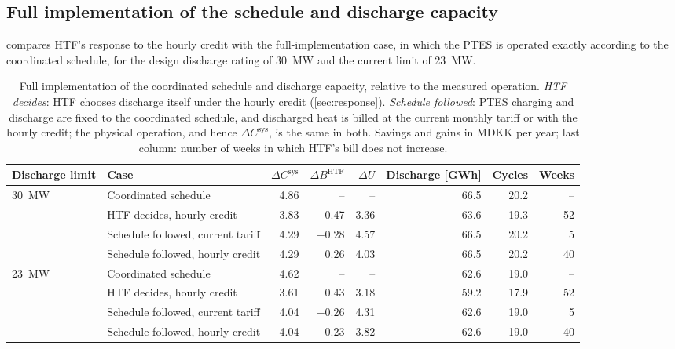 \subsection{Full implementation of the schedule and discharge capacity}
\label{sec:results-implementation}

 compares HTF's response to the hourly credit with the full-implementation case, in which the PTES is operated exactly according to the coordinated schedule, for the design discharge rating of 30~MW and the current limit of 23~MW.

\begin{table}[!htb]
    \centering
    \small
    \caption{Full implementation of the coordinated schedule and discharge capacity, relative to the measured operation. \emph{HTF decides}: HTF chooses discharge itself under the hourly credit (\cref{sec:response}). \emph{Schedule followed}: PTES charging and discharge are fixed to the coordinated schedule, and discharged heat is billed at the current monthly tariff or with the hourly credit; the physical operation, and hence $\Delta C^{\mathrm{sys}}$, is the same in both. Savings and gains in MDKK per year; last column: number of weeks in which HTF's bill does not increase.}
    \label{tab:implementation}
    \begin{tabular}{llrrrrrr}
        \toprule
        Discharge limit & Case & $\Delta C^{\mathrm{sys}}$ & $\Delta B^{\mathrm{HTF}}$ & $\Delta U$ & Discharge [GWh] & Cycles & Weeks \\
        \midrule
        30~MW & Coordinated schedule & 4.86 & -- & -- & 66.5 & 20.2 & -- \\
              & HTF decides, hourly credit & 3.83 & 0.47 & 3.36 & 63.6 & 19.3 & 52 \\
              & Schedule followed, current tariff & 4.29 & $-0.28$ & 4.57 & 66.5 & 20.2 & 5 \\
              & Schedule followed, hourly credit & 4.29 & 0.26 & 4.03 & 66.5 & 20.2 & 40 \\
        \midrule
        23~MW & Coordinated schedule & 4.62 & -- & -- & 62.6 & 19.0 & -- \\
              & HTF decides, hourly credit & 3.61 & 0.43 & 3.18 & 59.2 & 17.9 & 52 \\
              & Schedule followed, current tariff & 4.04 & $-0.26$ & 4.31 & 62.6 & 19.0 & 5 \\
              & Schedule followed, hourly credit & 4.04 & 0.23 & 3.82 & 62.6 & 19.0 & 40 \\
        \bottomrule
    \end{tabular}
\end{table}

